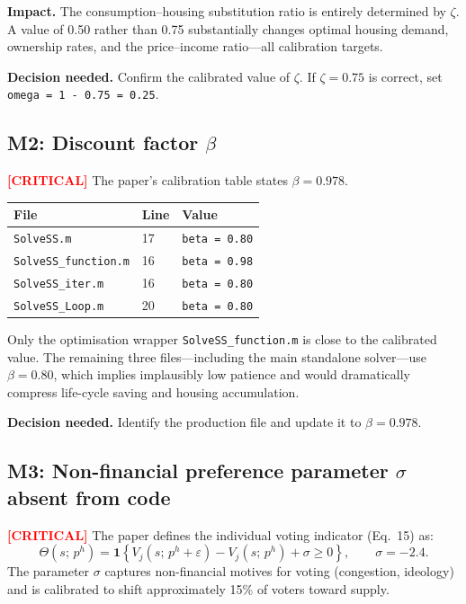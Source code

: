 \documentclass[11pt]{article}
\newcommand{\critical}{\textcolor{red}{\textbf{[CRITICAL]}}}
\begin{document}
\medskip
\noindent\textbf{Impact.} The consumption--housing substitution ratio is entirely determined by $\zeta$. A value of 0.50 rather than 0.75 substantially changes optimal housing demand, ownership rates, and the price--income ratio---all calibration targets.

\noindent\textbf{Decision needed.} Confirm the calibrated value of $\zeta$. If $\zeta=0.75$ is correct, set \texttt{omega = 1 - 0.75 = 0.25}.

\subsection*{M2: Discount factor $\beta$}

\critical{} The paper's calibration table states $\beta = 0.978$.

\begin{center}
\begin{tabular}{lll}
\toprule
File & Line & Value \\
\midrule
\texttt{SolveSS.m}          & 17 & \texttt{beta = 0.80} \\
\texttt{SolveSS\_function.m} & 16 & \texttt{beta = 0.98} \\
\texttt{SolveSS\_iter.m}    & 16 & \texttt{beta = 0.80} \\
\texttt{SolveSS\_Loop.m}    & 20 & \texttt{beta = 0.80} \\
\bottomrule
\end{tabular}
\end{center}

Only the optimisation wrapper \texttt{SolveSS\_function.m} is close to the calibrated value.
The remaining three files---including the main standalone solver---use $\beta = 0.80$,
which implies implausibly low patience and would dramatically compress life-cycle saving
and housing accumulation.

\noindent\textbf{Decision needed.} Identify the production file and update it to $\beta = 0.978$.

\subsection*{M3: Non-financial preference parameter $\sigma$ absent from code}

\critical{} The paper defines the individual voting indicator (Eq.~15) as:
\[
  \Theta(s;\,p^h) = \mathbf{1}\!\left\{V_j(s;\,p^h+\varepsilon) - V_j(s;\,p^h) + \sigma \geq 0\right\},
  \qquad \sigma = -2.4.
\]
The parameter $\sigma$ captures non-financial motives for voting (congestion, ideology)
and is calibrated to shift approximately 15\% of voters toward supply.
\end{document}
